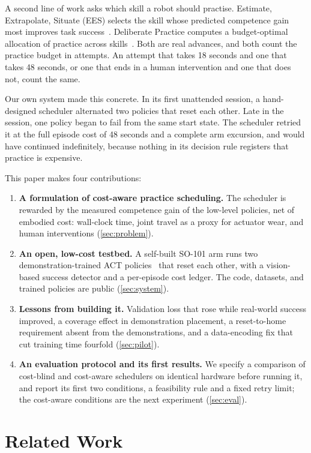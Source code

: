 \documentclass[runningheads]{llncs}
\begin{document}
A second line of work asks which skill a robot should practise. Estimate, Extrapolate, Situate (EES) selects the skill whose predicted competence gain most improves task success~\cite{kumar2024}. Deliberate Practice computes a budget-optimal allocation of practice across skills~\cite{vats2026}. Both are real advances, and both count the practice budget in attempts. An attempt that takes 18 seconds and one that takes 48 seconds, or one that ends in a human intervention and one that does not, count the same.

Our own system made this concrete. In its first unattended session, a hand-designed scheduler alternated two policies that reset each other. Late in the session, one policy began to fail from the same start state. The scheduler retried it at the full episode cost of 48 seconds and a complete arm excursion, and would have continued indefinitely, because nothing in its decision rule registers that practice is expensive.

This paper makes four contributions:
\begin{enumerate}
\item \textbf{A formulation of cost-aware practice scheduling.} The scheduler is rewarded by the measured competence gain of the low-level policies, net of embodied cost: wall-clock time, joint travel as a proxy for actuator wear, and human interventions (\cref{sec:problem}).
\item \textbf{An open, low-cost testbed.} A self-built SO-101 arm runs two demonstration-trained ACT policies~\cite{zhao2023} that reset each other, with a vision-based success detector and a per-episode cost ledger. The code, datasets, and trained policies are public (\cref{sec:system}).
\item \textbf{Lessons from building it.} Validation loss that rose while real-world success improved, a coverage effect in demonstration placement, a reset-to-home requirement absent from the demonstrations, and a data-encoding fix that cut training time fourfold (\cref{sec:pilot}).
\item \textbf{An evaluation protocol and its first results.} We specify a comparison of cost-blind and cost-aware schedulers on identical hardware before running it, and report its first two conditions, a feasibility rule and a fixed retry limit; the cost-aware conditions are the next experiment (\cref{sec:eval}).
\end{enumerate}

\section{Related Work}
\label{sec:related}
\end{document}
